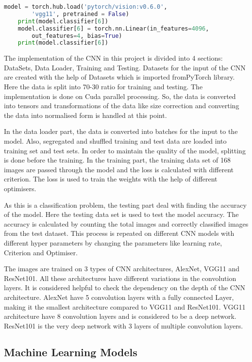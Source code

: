 \begin{lstlisting}[language=Python, frame=single, caption=Using PyTorch pre-defined modules]
    model = torch.hub.load('pytorch/vision:v0.6.0', 
    	'vgg11', pretrained = False)
    print(model.classifier[6])
    model.classifier[6] = torch.nn.Linear(in_features=4096, 
    	out_features=4, bias=True)
    print(model.classifier[6])
\end{lstlisting}

The implementation of the CNN in this project is divided into 4 sections: DataSets, Data Loader, Training and Testing. Datasets for the input of the CNN are created with the help of Datasets which is imported fromPyTorch library. Here the data is split into 70-30 ratio for training and testing. The implementation is done on Cuda parallel processing. So, the data is converted into tensors and transformations of the data like size correction and converting the data into normalised form is handled at this point.

In the data loader part, the data is converted into batches for the input to the model. Also, segregated and shuffled training and test data are loaded into training set and test sets. In order to maintain the quality of the model, splitting is done before the training. In the training part, the training data set of 168 images are passed through the model and the loss is calculated with different criterion. The loss is used to train the weights with the help of different optimisers.

As this is a classification problem, the testing part deal with finding the accuracy of the model. Here the testing data set is used to test the model accuracy. The accuracy is calculated by counting the total images and correctly classified images from the test dataset. This process is repeated on different CNN models with different hyper parameters by changing the parameters like learning rate, Criterion and Optimiser.

The images are trained on 3 types of CNN architectures, AlexNet, VGG11 and ResNet101. All these architectures have different variations in the convolution layers. It is considered helpful to check the dependency on the depth of the CNN architecture. AlexNet have 5 convolution layers with a fully connected Layer, making it the smallest architecture compared to VGG11 and ResNet101. VGG11 architecture have 8 convolution layers and is considered to be a deep network. ResNet101 is the very deep network with 3 layers of multiple convolution layers.

\subsection{Machine Learning Models}

